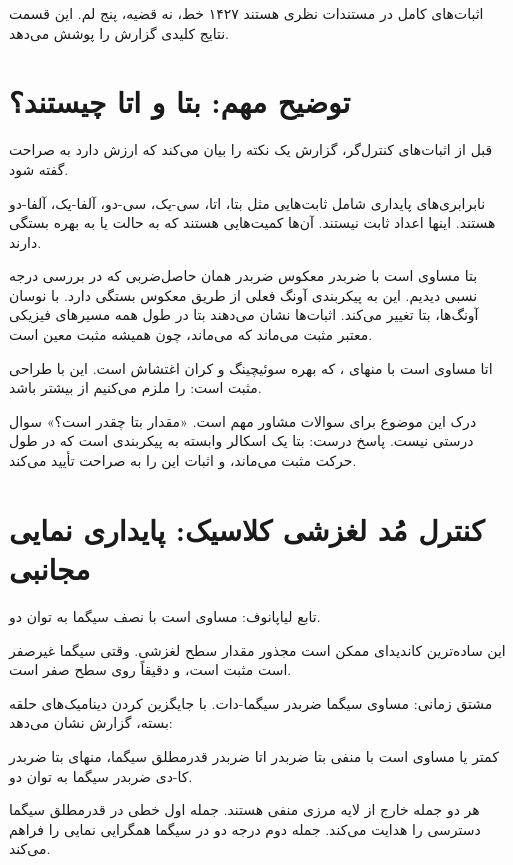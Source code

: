 \documentclass[12pt, a4paper]{article}
\newcommand{\dash}{\lr{---}}
\begin{document}
اثبات‌های کامل در مستندات نظری هستند \dash{} ۱۴۲۷ خط، نه قضيه، پنج لم. اين قسمت نتايج کليدی گزارش را پوشش می‌دهد.

\section{توضيح مهم: بتا و اتا چيستند؟}

قبل از اثبات‌های کنترل‌گر، گزارش يک نکته را بيان می‌کند که ارزش دارد به صراحت گفته شود.

نابرابری‌های پايداری شامل ثابت‌هايی مثل بتا، اتا، سی-يک، سی-دو، آلفا-يک، آلفا-دو هستند. اينها اعداد ثابت نيستند. آن‌ها کميت‌هايی هستند که به حالت يا به بهره بستگی دارند.

بتا مساوی است با  ضربدر معکوس  ضربدر  \dash{} همان حاصل‌ضربی که در بررسی درجه نسبی ديديم. اين به پيکربندی آونگ فعلی از طريق معکوس  بستگی دارد. با نوسان آونگ‌ها، بتا تغيير می‌کند. اثبات‌ها نشان می‌دهند بتا در طول همه مسيرهای فيزيکی معتبر مثبت می‌ماند \dash{} که می‌ماند، چون  هميشه مثبت معين است.

اتا مساوی است با  منهای ، که  بهره سوئيچينگ و  کران اغتشاش است. اين با طراحی مثبت است:  را ملزم می‌کنيم از  بيشتر باشد.

درک اين موضوع برای سوالات مشاور مهم است. «مقدار بتا چقدر است؟» سوال درستی نيست. پاسخ درست: بتا يک اسکالر وابسته به پيکربندی است که در طول حرکت مثبت می‌ماند، و اثبات اين را به صراحت تأييد می‌کند.

\section{کنترل مُد لغزشی کلاسيک: پايداری نمايی مجانبی}

تابع لياپانوف:  مساوی است با نصف سيگما به توان دو.

اين ساده‌ترين کانديدای ممکن است \dash{} مجذور مقدار سطح لغزشی. وقتی سيگما غيرصفر است مثبت است، و دقيقاً روی سطح صفر است.

مشتق زمانی:  مساوی سيگما ضربدر سيگما-دات. با جايگزين کردن ديناميک‌های حلقه بسته، گزارش نشان می‌دهد:

 کمتر يا مساوی است با منفی بتا ضربدر اتا ضربدر قدرمطلق سيگما، منهای بتا ضربدر کا-دی ضربدر سيگما به توان دو.

هر دو جمله خارج از لايه مرزی منفی هستند. جمله اول \dash{} خطی در قدرمطلق سيگما \dash{} دسترسی را هدايت می‌کند. جمله دوم \dash{} درجه دو در سيگما \dash{} همگرايی نمايی را فراهم می‌کند.
\end{document}
